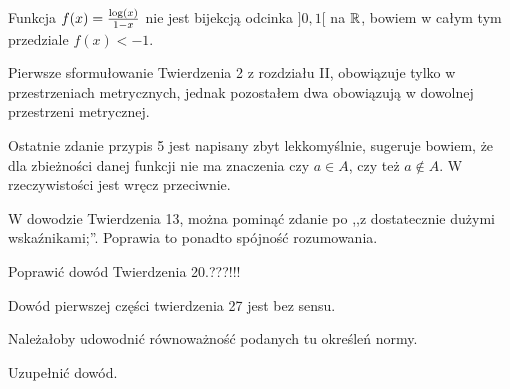 \documentclass[a4paper,11pt]{article}
\begin{document}
\start {} Funkcja $f( x ) = \frac{ \log( x ) }{ 1 - x }$ nie jest
bijekcją odcinka $] 0, 1 [$ na $\mathbb{R}$, bowiem w całym tym przedziale
$f( x ) < -1$.

\vspace{\spaceFour}


\start {} Pierwsze sformułowanie Twierdzenia 2 z rozdziału II,
obowiązuje tylko w przestrzeniach metrycznych, jednak pozostałem dwa
obowiązują w dowolnej przestrzeni metrycznej.

\vspace{\spaceFour}


\start {} Ostatnie zdanie przypis 5 jest napisany zbyt
lekkomyślnie, sugeruje bowiem, że dla zbieżności danej funkcji nie ma
znaczenia czy $a \in A$, czy też $a \notin A$. W rzeczywistości jest
wręcz przeciwnie.

\vspace{\spaceFour}


\start {} W dowodzie Twierdzenia 13, można pominąć zdanie po ,,z
dostatecznie dużymi wskaźnikami;''. Poprawia to ponadto spójność
rozumowania.

\vspace{\spaceFour}


\start {} Poprawić dowód Twierdzenia 20.???!!!

\vspace{\spaceFour}


\start {} Dowód pierwszej części twierdzenia 27 jest bez sensu.

\vspace{\spaceFour}


\start {} Należałoby udowodnić równoważność podanych tu określeń
normy.

\vspace{\spaceFour}


\start {} Uzupełnić dowód.

\vspace{\spaceFour}
\end{document}
